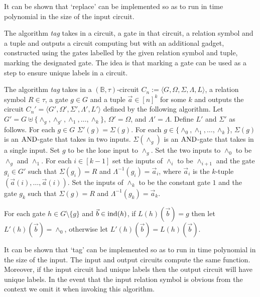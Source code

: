 \documentclass[../paper.tex]{subfiles}
\begin{document}
It can be shown that `replace' can be implemented so as to run in time
polynomial in the size of the input circuit.

The algorithm \emph{tag} takes in a circuit, a gate in that circuit, a relation
symbol and a tuple and outputs a circuit computing but with an additional
gadget, constructed using the gates labelled by the given relation symbol and
tuple, marking the designated gate. The idea is that marking a gate can be used
as a step to ensure unique labels in a circuit.

\begin{definition}
  The algorithm \emph{tag} takes in a $(\mathbb{B}, \tau)$-circuit $C_n :=
  \langle G, \Omega, \Sigma, \Lambda, L \rangle$, a relation symbol $R \in
  \tau$, a gate $g \in G$ and a tuple $\vec{a} \in [n]^k$ for some $k$ and
  outputs the circuit $C_n' = \langle G', \Omega', \Sigma', \Lambda', L'\rangle$
  defined by the following algorithm. Let $G' = G \uplus \{\land_g, \land_{g'},
  \land_1, \ldots , \land_k\}$, $\Omega' = \Omega$, and $\Lambda' = \Lambda$.
  Define $L'$ and $\Sigma'$ as follows. For each $g \in G$ $\Sigma'(g) =
  \Sigma(g)$. For each $g \in \{\land_0, \land_1, \ldots , \land_k \}$,
  $\Sigma(g)$ is an $\text{\upshape AND}$-gate that takes in two inputs. $\Sigma(\land_g)$ is
  an $\text{\upshape AND}$-gate that takes in a single input. Set $g$ to be the lone input to
  $\land_g$. Set the two inputs to $\land_0$ to be $\land_g$ and $\land_1$. For
  each $i \in [k-1]$ set the inputs of $\land_i$ to be $\land_{i+1}$ and the
  gate $g_i \in G'$ such that $\Sigma(g_i) = R$ and $\Lambda^{-1}(g_i) =
  \vec{a}_i$, where $\vec{a}_i$ is the $k$-tuple $(\vec{a}(i), \ldots,
  \vec{a}(i))$. Set the inputs of $\land_k$ to be the constant gate $1$ and the
  gate $g_k$ such that $\Sigma(g) = R$ and $\Lambda^{-1}(g_k) = \vec{a}_k$.

  For each gate $h \in G \setminus \{g\}$ and $\vec{b} \in \text{\upshape ind}(h)$, if
  $L(h)(\vec{b}) = g$ then let $L'(h)(\vec{b}) = \land_0$, otherwise let
  $L'(h)(\vec{b}) = L(h)(\vec{b})$.

\end{definition}

It can be shown that `tag' can be implemented so as to run in time polynomial in
the size of the input. The input and output circuits compute the same function.
Moreover, if the input circuit had unique labels then the output circuit will
have unique labels. In the event that the input relation symbol is obvious from
the context we omit it when invoking this algorithm.
\end{document}
